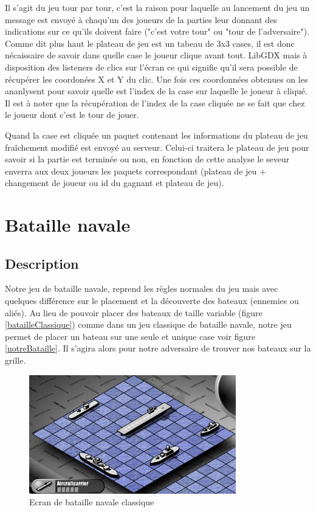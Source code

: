\documentclass{report}
\begin{document}
Il s'agit du jeu tour par tour, c'est la raison pour laquelle au lancement du jeu un message est envoyé à chaqu'un des joueurs de la parties
leur donnant des indications sur ce qu'ils doivent faire ("c'est votre tour" ou "tour de l'adversaire").
Comme dit plus haut le plateau de jeu est un tabeau de 3x3 cases, il est donc nécaissaire
de savoir dans quelle case le joueur clique avant tout. LibGDX mais à disposition des listeners de clics sur l'écran ce qui signifie qu'il sera possible
de récupérer les coordonées X et Y du clic. Une fois ces coordonnées obtenues on les ananlysent pour savoir quelle est l'index de la case sur laquelle
le joueur à cliqué. Il est à noter que la récupération de l'index de la case cliquée ne se fait que chez le joueur dont c'est le tour de jouer.

Quand la case est cliquée un paquet contenant les informations du plateau de jeu fraîchement modifié est envoyé au serveur. Celui-ci traitera le plateau de jeu
pour savoir si la partie est terminée ou non, en fonction de cette analyse le seveur enverra aux deux joueurs les paquets correspondant (plateau de jeu +
 changement de joueur ou id du gagnant et plateau de jeu).

\section{Bataille navale}
\label{Bataille navale}

\subsection{Description}
Notre jeu de bataille navale, reprend les règles normales du jeu mais avec quelques différence sur le placement et la découverte des bateaux (ennemies ou aliés). Au lieu de pouvoir placer
des bateaux de taille variable (figure \ref{batailleClassique}) comme dans un jeu classique de bataille navale, notre jeu permet de placer un bateau sur une seule et unique case
voir figure \ref{notreBataille}. Il s'agira alors pour notre adversaire de trouver nos bateaux sur la grille.

\begin{figure}[H]
	\centering\includegraphics[width=9cm]{batailleClassique}
	\caption{Ecran de bataille navale classique}
	\label{batailleClassiqe}
\end{figure}
\end{document}
